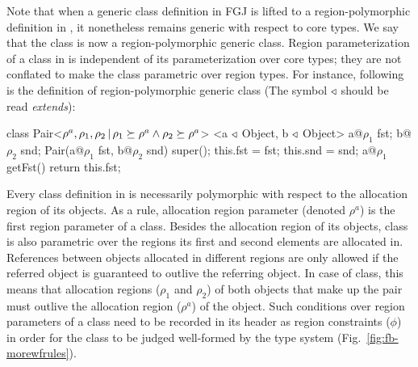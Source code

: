Note that when a generic class definition in FGJ is lifted to a
region-polymorphic definition in \FB, it nonetheless remains generic
with respect to core types. We say that the class is now a
region-polymorphic generic class. Region parameterization of a class
in \FB is independent of its parameterization over core types; they
are not conflated to make the class parametric over region types. For
instance, following is the definition of region-polymorphic generic
 class (The symbol $\triangleleft$ should be read \emph{extends}):
\begin{codejava}[mathescape=true]
class Pair<$\rho^a, \rho_1, \rho_2 \,|\, \rho_1 \succeq \rho^a 
                      \wedge \rho_2 \succeq \rho^a$>
          <a $\triangleleft$ Object, b $\triangleleft$ Object> {
  a@$\rho_1$ fst; 
  b@$\rho_2$ snd;
  Pair(a@$\rho_1$ fst, b@$\rho_2$ snd) {
    super(); 
    this.fst = fst; 
    this.snd = snd;
  }
  a@$\rho_1$ getFst() {
    return this.fst;
  }
}
\end{codejava}
Every class definition in \FB is necessarily polymorphic with respect
to the allocation region of its objects. As a rule, allocation region
parameter (denoted $\rho^a$) is the first region parameter of a class.
Besides the allocation region of its objects,  class is also
parametric over the regions its first and second elements are
allocated in. References between objects allocated in different
regions are only allowed if the referred object is guaranteed to
outlive the referring object. In case of  class, this means
that allocation regions ($\rho_1$ and $\rho_2$) of both objects that
make up the pair must outlive the allocation region ($\rho^a$) of the
 object. Such conditions over region parameters of a class
need to be recorded in its header as region constraints ($\phi$) in
order for the class to be judged well-formed by the type system
(Fig.~\ref{fig:fb-morewfrules}). 

